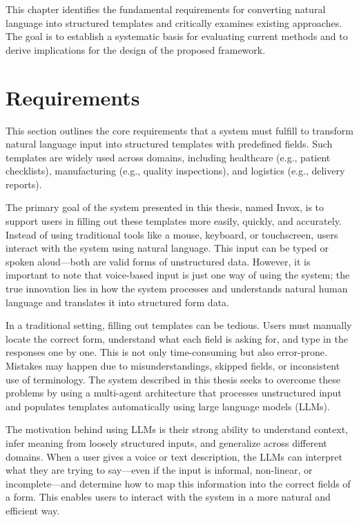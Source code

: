 This chapter identifies the fundamental requirements for converting natural language into structured templates and critically examines existing approaches. The goal is to establish a systematic basis for evaluating current methods and to derive implications for the design of the proposed framework.

\section{Requirements}

This section outlines the core requirements that a system must fulfill to transform natural language input into structured templates with predefined fields. Such templates are widely used across domains, including healthcare (e.g., patient checklists), manufacturing (e.g., quality inspections), and logistics (e.g., delivery reports).

The primary goal of the system presented in this thesis, named Invox, is to support users in filling out these templates more easily, quickly, and accurately. Instead of using traditional tools like a mouse, keyboard, or touchscreen, users interact with the system using natural language. This input can be typed or spoken aloud—both are valid forms of unstructured data. However, it is important to note that voice-based input is just one way of using the system; the true innovation lies in how the system processes and understands natural human language and translates it into structured form data.

In a traditional setting, filling out templates can be tedious. Users must manually locate the correct form, understand what each field is asking for, and type in the responses one by one. This is not only time-consuming but also error-prone. Mistakes may happen due to misunderstandings, skipped fields, or inconsistent use of terminology. The system described in this thesis seeks to overcome these problems by using a multi-agent architecture that processes unstructured input and populates templates automatically using large language models (LLMs).

The motivation behind using LLMs is their strong ability to understand context, infer meaning from loosely structured inputs, and generalize across different domains. When a user gives a voice or text description, the LLMs can interpret what they are trying to say—even if the input is informal, non-linear, or incomplete—and determine how to map this information into the correct fields of a form. This enables users to interact with the system in a more natural and efficient way.

